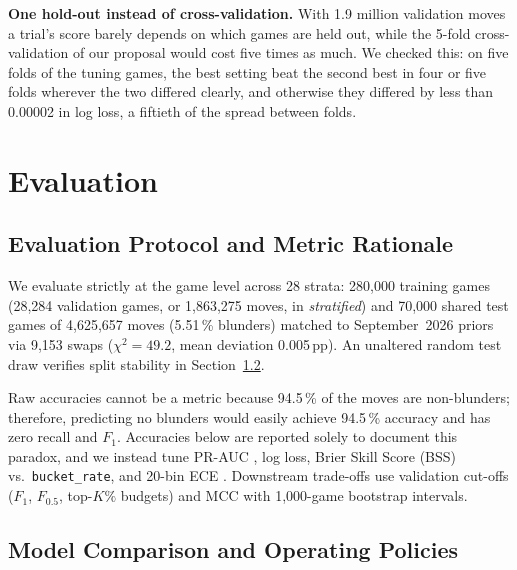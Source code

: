 \documentclass[a4paper,oneside,bibliography=totoc]{scrbook}
\newcommand{\stale}[1]{\textcolor{BurntOrange}{#1}}
\begin{document}
\textbf{One hold-out instead of cross-validation.} With \stale{1.9} million validation moves a trial's score
barely depends on which games are held out, while the 5-fold cross-validation of our proposal would cost five
times as much. We checked this: on five folds of the tuning games, the best setting beat the second best in
\stale{four or five} folds wherever the two differed clearly, and otherwise they differed by less than
\stale{0.00002} in log loss, a fiftieth of the spread between folds.

\chapter{Evaluation}
\label{ch:evaluation}

\section{Evaluation Protocol and Metric Rationale}
\label{sec:setupeval}

We evaluate strictly at the game level across 28 strata: 280,000 training games (28,284 validation
games, or 1,863,275 moves, in \emph{stratified}) and 70,000 shared test games of 4,625,657 moves (5.51\,\%
blunders) matched to September~2026 priors via 9,153 swaps ($\chi^2 = 49.2$, mean deviation 0.005\,pp). An
unaltered random test draw verifies split stability in Section~\ref{sec:results}.

Raw accuracies cannot be a metric because 94.5\,\% of the moves are non-blunders; therefore, predicting no
blunders would easily achieve 94.5\,\% accuracy and has zero recall and $F_1$. Accuracies below are
reported solely to document this paradox, and we instead tune PR-AUC \cite{saito2015prc}, log loss, Brier
Skill Score (BSS) vs.\ \texttt{bucket\_rate}, and 20-bin ECE \cite{guo2017calibration}. Downstream
trade-offs use validation cut-offs ($F_1$, $F_{0.5}$, top-$K\%$ budgets) and MCC with 1,000-game bootstrap
intervals.

\section{Model Comparison and Operating Policies}
\label{sec:results}
\end{document}
